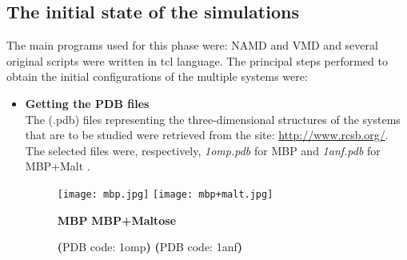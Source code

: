 \subsection{The initial state of the simulations}
The main programs used for this phase were: NAMD \cite{ref:NAMD} and VMD \cite{humphrey1996vmd} and several original scripts were written in tcl language. The principal steps performed to obtain the initial configurations of the multiple systems were:
\begin{itemize}
\item \textbf{Getting the PDB files}\\
The (.pdb) files representing the three-dimensional structures of the systems that are to be studied were retrieved from the site: \url{http://www.rcsb.org/}. The selected files were, respectively, \textit{1omp.pdb} for MBP \cite{sharff1992crystallographic} and \textit{1anf.pdb} for MBP+Malt \cite{quiocho1997extensive}.
\vspace{-0.25cm}
\begin{figure}[h]
\begin{center}
\begin{minipage}[t]{0.9\textwidth}
\centering
\hspace{0.75cm}
\texttt{[image: mbp.jpg]}
\hspace{0.2cm}
\texttt{[image: mbp+malt.jpg]}
\end{minipage} 

\hspace{1.65cm}
\textbf{MBP}
\hspace{4.75cm}
\textbf{MBP+Maltose}

\hspace{0.6cm}
\textbf{(}\small{PDB code: 1omp}\textbf{)}
\hspace{3.8cm}
\textbf{(}\small{PDB code: 1anf}\textbf{)}
\end{center}


\end{figure}
\end{itemize}
